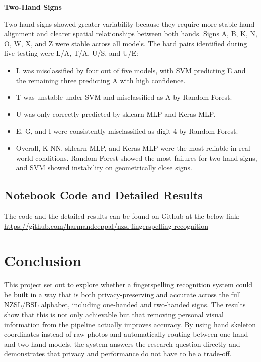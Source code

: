 \documentclass[conference]{IEEEtran}
\begin{document}
\textbf{Two-Hand Signs}

Two-hand signs showed greater variability because they require more stable hand alignment and clearer spatial relationships between both hands. Signs A, B, K, N, O, W, X, and Z were stable across all models. The hard pairs identified during live testing were L/A, T/A, U/S, and U/E:
\begin{itemize}
  \item L was misclassified by four out of five models, with SVM predicting E and the remaining three predicting A with high confidence.
  \item T was unstable under SVM and misclassified as A by Random Forest.
  \item U was only correctly predicted by sklearn MLP and Keras MLP.
  \item E, G, and I were consistently misclassified as digit 4 by Random Forest.
  \item Overall, K-NN, sklearn MLP, and Keras MLP were the most reliable in real-world conditions. Random Forest showed the most failures for two-hand signs, and SVM showed instability on geometrically close signs.
\end{itemize}

\subsection{Notebook Code and Detailed Results}

\begin{sloppypar}
The code and the detailed results can be found on Github at the below link:\\
\url{https://github.com/harmandeeppal/nzsl-fingerspelling-recognition}
\end{sloppypar}

\section*{Conclusion}

This project set out to explore whether a fingerspelling recognition system could be built in a way that is both privacy-preserving and accurate across the full NZSL/BSL alphabet, including one-handed and two-handed signs. The results show that this is not only achievable but that removing personal visual information from the pipeline actually improves accuracy. By using hand skeleton coordinates instead of raw photos and automatically routing between one-hand and two-hand models, the system answers the research question directly and demonstrates that privacy and performance do not have to be a trade-off.
\end{document}

